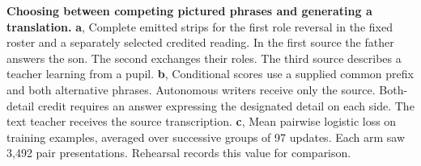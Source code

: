 \textbf{Choosing between competing pictured phrases and generating a translation.} \textbf{a}, Complete emitted strips for the first role reversal in the fixed roster and a separately selected credited reading. In the first source the father answers the son. The second exchanges their roles. The third source describes a teacher learning from a pupil. \textbf{b}, Conditional scores use a supplied common prefix and both alternative phrases. Autonomous writers receive only the source. Both-detail credit requires an answer expressing the designated detail on each side. The text teacher receives the source transcription. \textbf{c}, Mean pairwise logistic loss on training examples, averaged over successive groups of 97 updates. Each arm saw 3,492 pair presentations. Rehearsal records this value for comparison.
